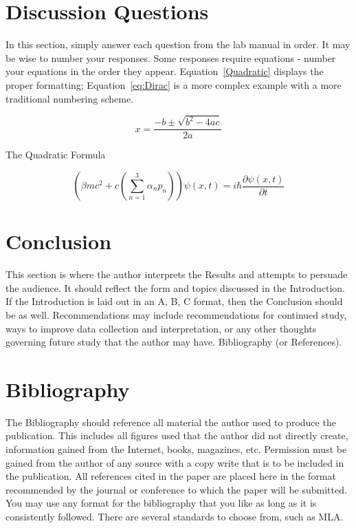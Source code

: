 \documentclass[11pt,letter]{report}
\begin{document}
\section*{Discussion Questions}
In this section, simply answer each question from the lab manual in order. It may be wise to number your responses. Some responses require equations - number your equations in the order they appear. Equation~\ref{Quadratic} displays the proper formatting; Equation~\ref{eq:Dirac} is a more complex example with a more traditional numbering scheme.

\begin{eqfloat}[!htb]
	\begin{equation*}
		x=\frac{-b\pm\sqrt{b^2-4ac}}{2a}
	\end{equation*}
\caption{The Quadratic Formula}
\label{Quadratic}
\end{eqfloat}
	
\begin{equation}
	\label{eq:Dirac}
	\left (
  \beta mc^2 + c 
     \left ( 
         \sum_{n=1}^3 \alpha_n p_n 
     \right )
	\right )
	\psi(x,t)
	=
	i \hbar \dfrac{\partial \psi(x,t) }{\partial t}
\end{equation}


\section*{Conclusion}
This section is where the author interprets the Results and attempts to persuade the audience. It should reflect the form and topics discussed in the Introduction. If the Introduction is laid out in an A, B, C format, then the Conclusion should be as well. Recommendations may include recommendations for continued study, ways to improve data collection and interpretation, or any other thoughts governing future study that the author may have. Bibliography (or References).

\section*{Bibliography}
The Bibliography should reference all material the author used to produce the publication. This includes all figures used that the author did not directly create, information gained from the Internet, books, magazines, etc. Permission must be gained from the author of any source with a copy write that is to be included in the
publication. All references cited in the paper are placed here in the format recommended by the journal or conference to which the paper will be submitted.
You may use any format for the bibliography that you like as long as it is consistently followed. There are several standards to choose from, such as MLA.
\end{document}
